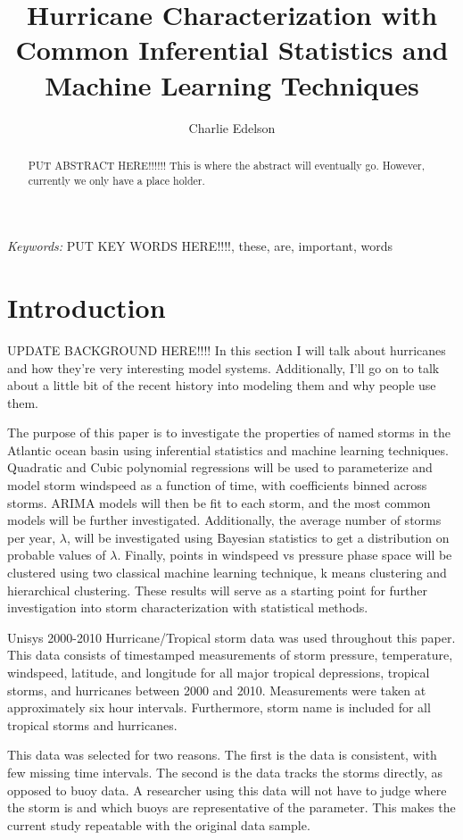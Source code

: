 \documentclass{article}
\title{Hurricane Characterization with Common Inferential Statistics and Machine Learning Techniques}
\author{Charlie Edelson}
\date{}
\providecommand{\keywords}[1]{\small{\textit{Keywords:} #1}}
\begin{document}
	
	\maketitle

	\begin{abstract}
	PUT ABSTRACT HERE!!!!!! This is where the abstract will eventually go. However, currently we only have a place holder.
	\end{abstract}
	
	\keywords{PUT KEY WORDS HERE!!!!, these, are, important, words}

	\section{Introduction}
	UPDATE BACKGROUND HERE!!!! In this section I will talk about hurricanes and how they're very interesting model systems. Additionally, I'll go on to talk about a little bit of the recent history into modeling them and why people use them.
	
	The purpose of this paper is to investigate the properties of named storms in the Atlantic ocean basin using inferential 
statistics and machine learning techniques. Quadratic and Cubic polynomial regressions will be used to parameterize and model storm 
windspeed as a function of time, with coefficients binned across storms. ARIMA models will then be fit to each storm, and the most common 
models will be further investigated. Additionally, the average number of storms per year, $\lambda$, will be investigated using Bayesian 
statistics to get a distribution on probable values of $\lambda$. Finally, points in windspeed vs pressure phase space will be clustered 
using two classical machine learning technique, k means clustering and hierarchical clustering. These results will serve as a starting point for further investigation into storm characterization with statistical methods.

	Unisys 2000-2010 Hurricane/Tropical storm data was used throughout this paper\cite{Unisys}. This data consists of timestamped 
measurements of storm pressure, temperature, windspeed, latitude, and longitude for all major tropical depressions, tropical storms, and 
hurricanes between 2000 and 2010. Measurements were taken at approximately six hour intervals. Furthermore, storm name is included for all 
tropical storms and hurricanes.

	This data was selected for two reasons. The first is the data is consistent, with few missing time intervals. The second is the 
data tracks the storms directly, as opposed to buoy data. A researcher using this data will not have to judge where the storm is and which 
buoys are representative of the parameter. This makes the current study repeatable with the original data sample.
\end{document}
